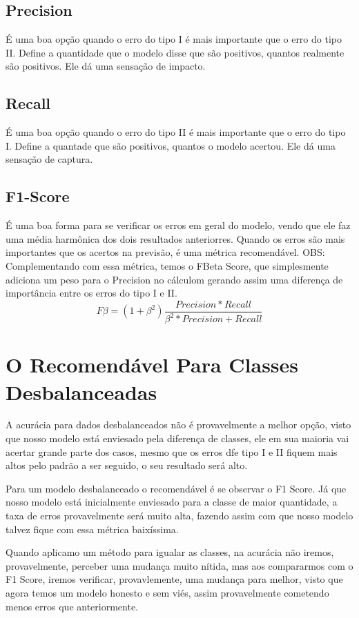 \documentclass{article}
\begin{document}
\subsection{Precision}
É uma boa opção quando o erro do tipo I é mais importante que o erro do tipo II. Define a quantidade que o modelo disse que são positivos, quantos realmente são positivos. Ele dá uma sensação de impacto.

\subsection{Recall}
É uma boa opção quando o erro do tipo II é mais importante que o erro do tipo I. Define a quantade que são positivos, quantos o modelo acertou. Ele dá uma sensação de captura.

\subsection{F1-Score}
É uma boa forma para se verificar os erros em geral do modelo, vendo que ele faz uma média harmônica dos dois resultados anteriorres. Quando os erros são mais importantes que os acertos na previsão, é uma métrica recomendável. OBS: Complementando com essa métrica, temos o FBeta Score, que simplesmente adiciona um peso para o Precision no cálculom gerando assim uma diferença de importância entre os erros do tipo I e II.
\begin{equation*}
    F\beta = (1+\beta^2)\frac{Precision*Recall}{\beta^2*Precision+ Recall}
\end{equation*}

\section{O Recomendável Para Classes Desbalanceadas}

A acurácia para dados desbalanceados não é provavelmente a melhor opção, visto que nosso modelo está enviesado pela diferença de classes, ele em sua maioria vai acertar grande parte dos casos, mesmo que os erros dfe tipo I e II fiquem mais altos pelo padrão a ser seguido, o seu resultado será alto.

Para um modelo desbalanceado o recomendável é se observar o F1 Score. Já que nosso modelo está inicialmente enviesado para a classe de maior quantidade, a taxa de erros provavelmente será muito alta, fazendo assim com que nosso modelo talvez fique com essa métrica baixíssima.

Quando aplicamo um método para igualar as classes, na acurácia não iremos, provavelmente, perceber uma mudança muito nítida, mas aos compararmos com o F1 Score, iremos verificar, provavlemente, uma mudança para melhor, visto que agora temos um modelo honesto e sem viés, assim provavelmente cometendo menos erros que anteriormente.
\end{document}
